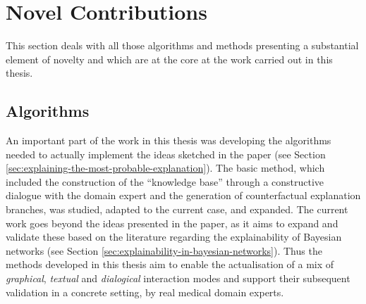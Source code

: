 \section{Novel Contributions}\label{sec:novel-contributions}
This section deals with all those algorithms and methods presenting a substantial element of novelty and which are at the core at the work carried out in this thesis.

\subsection{Algorithms} \label{subsec:algorithms-novel}
An important part of the work in this thesis was developing the algorithms needed to actually implement the ideas sketched in the paper \citep{Butz2018} (see Section \ref{sec:explaining-the-most-probable-explanation}).
The basic method, which included the construction of the \enquote{knowledge base} through a constructive dialogue with the domain expert and the generation of counterfactual explanation branches, was studied, adapted to the current case, and expanded.
The current work goes beyond the ideas presented in the paper, as it aims to expand and validate these based on the literature regarding the explainability of Bayesian networks (see Section \ref{sec:explainability-in-bayesian-networks}).
Thus the methods developed in this thesis aim to enable the actualisation of a mix of \textit{graphical}, \textit{textual} and \textit{dialogical} interaction modes and support their subsequent validation in a concrete setting, by real medical domain experts.

